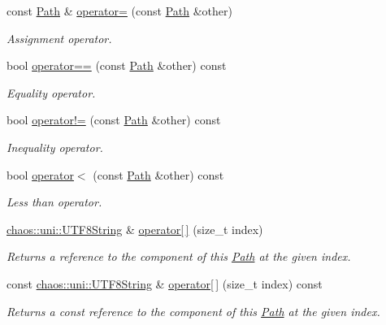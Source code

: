 \begin{DoxyCompactItemize}
const \hyperlink{classchaos_1_1io_1_1sys_1_1_path}{Path} \& \hyperlink{classchaos_1_1io_1_1sys_1_1_path_a45c70fc34ff619e890d5bc807dd70d8b}{operator=} (const \hyperlink{classchaos_1_1io_1_1sys_1_1_path}{Path} \&other)
\begin{DoxyCompactList}\small\item\em Assignment operator. \end{DoxyCompactList}\item 
bool \hyperlink{classchaos_1_1io_1_1sys_1_1_path_ac2e63307a0526625f4447f1d2a704e3b}{operator==} (const \hyperlink{classchaos_1_1io_1_1sys_1_1_path}{Path} \&other) const 
\begin{DoxyCompactList}\small\item\em Equality operator. \end{DoxyCompactList}\item 
bool \hyperlink{classchaos_1_1io_1_1sys_1_1_path_acd6dea0a797c0307179a5523239a299a}{operator!=} (const \hyperlink{classchaos_1_1io_1_1sys_1_1_path}{Path} \&other) const 
\begin{DoxyCompactList}\small\item\em Inequality operator. \end{DoxyCompactList}\item 
bool \hyperlink{classchaos_1_1io_1_1sys_1_1_path_a90858bbce348d5b36d0c31d771c601d8}{operator$<$} (const \hyperlink{classchaos_1_1io_1_1sys_1_1_path}{Path} \&other) const 
\begin{DoxyCompactList}\small\item\em Less than operator. \end{DoxyCompactList}\item 
\hyperlink{classchaos_1_1uni_1_1_u_t_f8_string}{chaos\+::uni\+::\+U\+T\+F8\+String} \& \hyperlink{classchaos_1_1io_1_1sys_1_1_path_ae7503e76ec85786225fc25b572deaeea}{operator\mbox{[}$\,$\mbox{]}} (size\+\_\+t index)
\begin{DoxyCompactList}\small\item\em Returns a reference to the component of this \hyperlink{classchaos_1_1io_1_1sys_1_1_path}{Path} at the given index. \end{DoxyCompactList}\item 
const \hyperlink{classchaos_1_1uni_1_1_u_t_f8_string}{chaos\+::uni\+::\+U\+T\+F8\+String} \& \hyperlink{classchaos_1_1io_1_1sys_1_1_path_aa3ee2fea4946e94c9bdb692bdffed522}{operator\mbox{[}$\,$\mbox{]}} (size\+\_\+t index) const 
\begin{DoxyCompactList}\small\item\em Returns a const reference to the component of this \hyperlink{classchaos_1_1io_1_1sys_1_1_path}{Path} at the given index. \end{DoxyCompactList}\item 

\end{DoxyCompactItemize}
